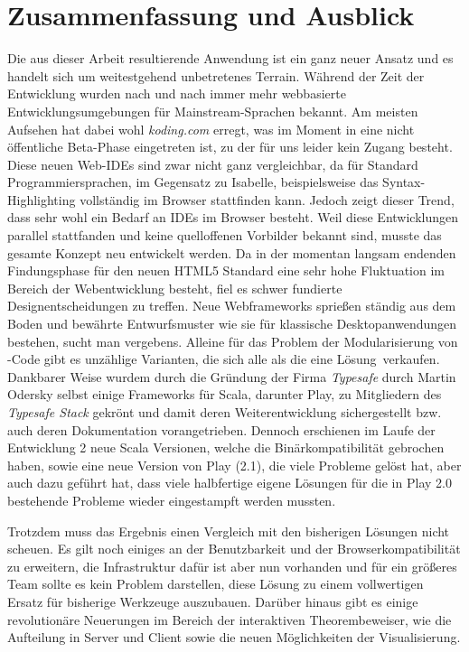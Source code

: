 \chapter{Zusammenfassung und Ausblick}

Die aus dieser Arbeit resultierende Anwendung ist ein ganz neuer Ansatz und es handelt sich um
weitestgehend unbetretenes Terrain. Während der Zeit der Entwicklung wurden nach und nach immer mehr
webbasierte Entwicklungsumgebungen für Mainstream-Sprachen bekannt. Am meisten Aufsehen hat dabei
wohl \textit{koding.com} erregt, was im Moment in eine nicht öffentliche Beta-Phase eingetreten ist,
zu der für uns leider kein Zugang besteht. Diese neuen Web-IDEs sind zwar nicht ganz vergleichbar,
da für Standard Programmiersprachen, im Gegensatz zu Isabelle, beispielsweise das Syntax-
Highlighting vollständig im Browser stattfinden kann. Jedoch zeigt dieser Trend, dass sehr wohl ein
Bedarf an IDEs im Browser besteht. Weil diese Entwicklungen parallel stattfanden und keine
quelloffenen Vorbilder bekannt sind, musste das gesamte Konzept neu entwickelt werden. Da in der
momentan langsam endenden Findungsphase für den neuen HTML5 Standard eine sehr hohe Fluktuation im
Bereich der Webentwicklung besteht, fiel es schwer fundierte Designentscheidungen zu treffen. Neue
Webframeworks sprießen ständig aus dem Boden und bewährte Entwurfsmuster wie sie für klassische
Desktopanwendungen bestehen, sucht man vergebens. Alleine für das Problem der Modularisierung von
-Code gibt es unzählige Varianten, die sich alle als \glqq die eine Lösung\grqq\ verkaufen.
Dankbarer Weise wurdem durch die Gründung der Firma \textit{Typesafe} durch Martin Odersky selbst
einige Frameworks für Scala, darunter Play, zu Mitgliedern des \textit{Typesafe Stack} gekrönt und
damit deren Weiterentwicklung sichergestellt bzw. auch deren Dokumentation vorangetrieben. Dennoch
erschienen im Laufe der Entwicklung 2 neue Scala Versionen, welche die Binärkompatibilität gebrochen
haben, sowie eine neue Version von Play (2.1), die viele Probleme gelöst hat, aber auch dazu geführt
hat, dass viele halbfertige eigene Lösungen für die in Play 2.0 bestehende Probleme wieder
eingestampft werden mussten.

Trotzdem muss das Ergebnis einen Vergleich mit den bisherigen Lösungen nicht scheuen. Es gilt noch
einiges an der Benutzbarkeit und der Browserkompatibilität zu erweitern, die Infrastruktur dafür ist
aber nun vorhanden und für ein größeres Team sollte es kein Problem darstellen, diese Lösung zu
einem vollwertigen Ersatz für bisherige Werkzeuge auszubauen. Darüber hinaus gibt es einige
revolutionäre Neuerungen im Bereich der interaktiven Theorembeweiser, wie die Aufteilung in Server
und Client sowie die neuen Möglichkeiten der Visualisierung.

